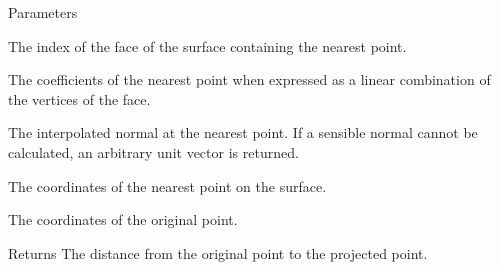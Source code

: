 \begin{DoxyParams}{Parameters}
\item[\mbox{\tt[out]} {\em face}]The index of the face of the surface containing the nearest point. \item[\mbox{\tt[out]} {\em coeffs}]The coefficients of the nearest point when expressed as a linear combination of the vertices of the face. \item[\mbox{\tt[out]} {\em normal}]The interpolated normal at the nearest point. If a sensible normal cannot be calculated, an arbitrary unit vector is returned. \item[\mbox{\tt[out]} {\em proj}]The coordinates of the nearest point on the surface. \item[\mbox{\tt[in]} {\em inp}]The coordinates of the original point. \end{DoxyParams}
\begin{DoxyReturn}{Returns}
The distance from the original point to the projected point. 
\end{DoxyReturn}
